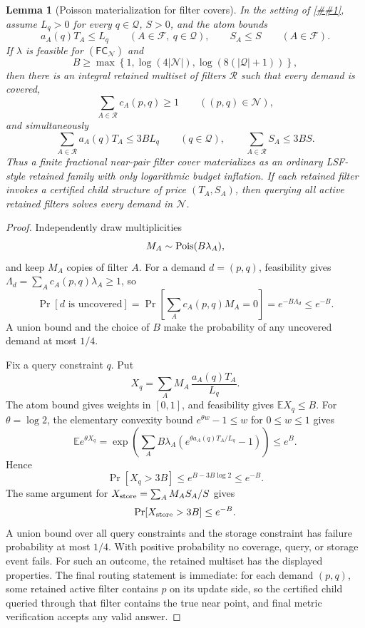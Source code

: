 \documentclass[10pt]{article}
\newcommand{\cref}[1]{\ref{##1}}
\newtheorem{lemma}[theorem]{Lemma}
\theoremstyle{definition}
\newcommand{\E}{\mathbb{E}}
\begin{document}
\begin{lemma}[Poisson materialization for filter covers]
   \label{lem:poisson-filter-cover-materialization}
   In the setting of \cref{lem:finite-filter-cover-dual}, assume $L_q>0$ for
   every $q\in\mathcal Q$, $S>0$, and the atom bounds
   \[
      a_A(q)T_A\le L_q\qquad(A\in\mathcal F,\ q\in\mathcal Q),
      \qquad
      S_A\le S\qquad(A\in\mathcal F).
   \]
   If $\lambda$ is feasible for \((\mathsf{FC}_{\mathcal N})\) and
   \[
      B\ge
      \max\left\{
         1,\log(4|\mathcal N|),\log(8(|\mathcal Q|+1))
      \right\},
   \]
   then there is an integral retained multiset of filters $\mathcal R$ such that
   every demand is covered,
   \[
      \sum_{A\in\mathcal R}c_A(p,q)\ge1
      \qquad((p,q)\in\mathcal N),
   \]
   and simultaneously
   \[
      \sum_{A\in\mathcal R}a_A(q)T_A\le3BL_q
      \qquad(q\in\mathcal Q),
      \qquad
      \sum_{A\in\mathcal R}S_A\le3BS .
   \]
   Thus a finite fractional near-pair filter cover materializes as an ordinary
   LSF-style retained family with only logarithmic budget inflation.  If each
   retained filter invokes a certified child structure of price $(T_A,S_A)$, then
   querying all active retained filters solves every demand in $\mathcal N$.
\end{lemma}

\begin{proof}
   Independently draw multiplicities
   \[
      M_A\sim{\rm Pois}(B\lambda_A),
   \]
   and keep $M_A$ copies of filter $A$.  For a demand $d=(p,q)$, feasibility gives
   \(\Lambda_d=\sum_Ac_A(p,q)\lambda_A\ge1\), so
   \[
      \Pr[d\text{ is uncovered}]
      =
      \Pr\left[\sum_Ac_A(p,q)M_A=0\right]
      =
      e^{-B\Lambda_d}
      \le e^{-B}.
   \]
   A union bound and the choice of $B$ make the probability of any uncovered
   demand at most $1/4$.

   Fix a query constraint $q$.  Put
   \[
      X_q=\sum_A M_A\,\frac{a_A(q)T_A}{L_q}.
   \]
   The atom bound gives weights in $[0,1]$, and feasibility gives
   $\E X_q\le B$.  For $\theta=\log 2$, the elementary convexity bound
   \(e^{\theta w}-1\le w\) for \(0\le w\le1\) gives
   \[
      \E e^{\theta X_q}
      =
      \exp\left(
         \sum_A B\lambda_A
         \left(e^{\theta a_A(q)T_A/L_q}-1\right)
      \right)
      \le e^B .
   \]
   Hence
   \[
      \Pr[X_q>3B]\le e^{B-3B\log2}\le e^{-B}.
   \]
   The same argument for
   \(X_{\rm store}=\sum_A M_AS_A/S\) gives
   \[
      \Pr[X_{\rm store}>3B]\le e^{-B}.
   \]
   A union bound over all query constraints and the storage constraint has
   failure probability at most $1/4$.  With positive probability no coverage,
   query, or storage event fails.  For such an outcome, the retained multiset has
   the displayed properties.  The final routing statement is immediate: for each
   demand $(p,q)$, some retained active filter contains $p$ on its update side,
   so the certified child queried through that filter contains the true near
   point, and final metric verification accepts any valid answer.
\end{proof}
\end{document}
